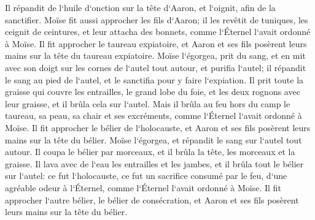 \verse Il répandit de l`huile d`onction sur la tête d`Aaron, et l`oignit, afin de la sanctifier. 
\verse Moïse fit aussi approcher les fils d`Aaron; il les revêtit de tuniques, les ceignit de ceintures, et leur attacha des bonnets, comme l`Éternel l`avait ordonné à Moïse. 
\verse Il fit approcher le taureau expiatoire, et Aaron et ses fils posèrent leurs mains sur la tête du taureau expiatoire. 
\verse Moïse l`égorgea, prit du sang, et en mit avec son doigt sur les cornes de l`autel tout autour, et purifia l`autel; il répandit le sang au pied de l`autel, et le sanctifia pour y faire l`expiation. 
\verse Il prit toute la graisse qui couvre les entrailles, le grand lobe du foie, et les deux rognons avec leur graisse, et il brûla cela sur l`autel. 
\verse Mais il brûla au feu hors du camp le taureau, sa peau, sa chair et ses excréments, comme l`Éternel l`avait ordonné à Moïse. 
\verse Il fit approcher le bélier de l`holocauste, et Aaron et ses fils posèrent leurs mains sur la tête du bélier. 
\verse Moïse l`égorgea, et répandit le sang sur l`autel tout autour. 
\verse Il coupa le bélier par morceaux, et il brûla la tête, les morceaux et la graisse. 
\verse Il lava avec de l`eau les entrailles et les jambes, et il brûla tout le bélier sur l`autel: ce fut l`holocauste, ce fut un sacrifice consumé par le feu, d`une agréable odeur à l`Éternel, comme l`Éternel l`avait ordonné à Moïse. 
\verse Il fit approcher l`autre bélier, le bélier de consécration, et Aaron et ses fils posèrent leurs mains sur la tête du bélier. 
